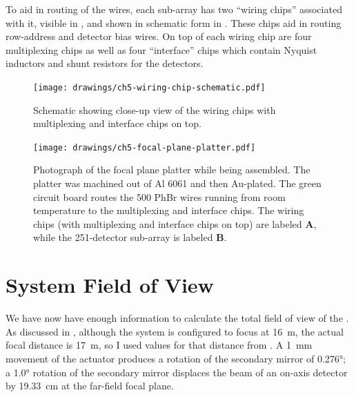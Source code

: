 To aid in routing of the wires, each sub-array has two ``wiring chips'' associated with it, visible in , and shown in schematic form in .
These chips aid in routing row-address and detector bias wires.
On top of each wiring chip are four multiplexing chips as well as four ``interface'' chips which contain Nyquist inductors and shunt resistors for the detectors.

\begin{figure}
\centering
\texttt{[image: drawings/ch5-wiring-chip-schematic.pdf]}
\caption[Wiring chip schematic]{
  Schematic showing close-up view of the wiring chips with multiplexing and interface chips on top.
}
\label{fig:ch5-wiring-chip-schematic}
\end{figure}

\begin{figure}
\centering
\texttt{[image: drawings/ch5-focal-plane-platter.pdf]}
\caption[Focal plane during assembly]{
  Photograph of the focal plane platter while being assembled.
  The platter was machined out of Al 6061 and then Au-plated.
  The green circuit board routes the 500 PhBr wires running from room temperature to the multiplexing and interface chips.
  The wiring chips (with multiplexing and interface chips on top) are labeled \textbf{A}, while the 251-detector sub-array is labeled \textbf{B}.
}
\label{fig:ch5-focal-plane-platter}
\end{figure}

\section{System Field of View} \label{sec:ch5-fov}

We have now have enough information to calculate the total field of view of the \Imager.
As discussed in , although the system is configured to focus at \SI{16}{\m}, the actual focal distance is \SI{17}{\m}, so I used values for that distance from .
A \SI{1}{\mm} movement of the actuator produces a rotation of the secondary mirror of \ang{0.276}; a \ang{1.0} rotation of the secondary mirror displaces the beam of an on-axis detector by \SI{19.33}{\cm} at the far-field focal plane.

